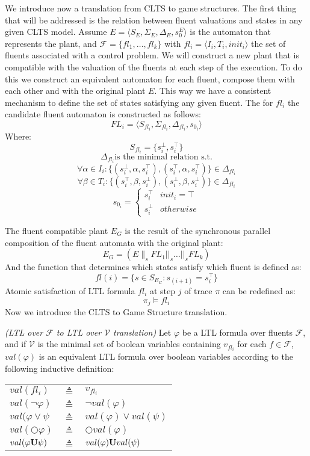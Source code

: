
We introduce now a translation from CLTS to game structures.
The first thing that will be addressed is the relation between fluent valuations and states in any given CLTS model. Assume $E = \langle S_E, \Sigma_E, \Delta_E, s^E_0 \rangle$ is the automaton that represents the plant, and $\mathcal{F}=\{fl_1,\ldots,fl_k\}$ with $fl_i = \langle I_i, T_i, init_i \rangle$ the set of fluents associated with a control problem. We will construct a new plant that is compatible with the valuation of the fluents at each step of the execution. To do this we construct an equivalent automaton for each fluent, compose them with each other and with the original plant $E$. This way we have a consistent mechanism to define the set of states satisfying any given fluent.  The for $fl_i$ the candidate fluent automaton is constructed as follows:
\[ FL_i = \langle S_{fl_i}, \Sigma_{fl_i}, \Delta_{fl_i}, s_{0_i}\rangle \]
Where:
\[S_{fl_i}= \{s^{\bot}_i, s^{\top}_i\} \]
\[\Delta_{fl_i} \text{is the minimal relation s.t.}\]
\[ \forall \alpha \in I_i: \{(s^{\bot}_i,\alpha,s^{\top}_i), (s^{\top}_i,\alpha,s^{\top}_i)\} \in \Delta_{fl_i} \]
\[ \forall \beta \in T_i: \{(s^{\top}_i,\beta,s^{\bot}_i), (s^{\bot}_i,\beta,s^{\bot}_i)\} \in \Delta_{fl_i} \]
\[
s_{0_i} = \begin{cases}
s^{\top}_i & init_i = \top \\
s^{\bot}_i & otherwise
\end{cases}
\]

The fluent compatible plant $E_G$ is the result of the synchronous parallel composition of the fluent automata with the original plant:
\[E_G = (E \parallel_s FL_1 ||_s \ldots ||_s FL_k) \]
And the function that determines which states satisfy which fluent is defined as:
\[ fl(i) = \{s \in S_{E_G} : s_{(i + 1)} = s^{\top}_i \} \]
Atomic satisfaction of LTL formula $fl_i$ at step $j$ of trace $\pi$ can be redefined as:
\[ \pi_j \models fl_i \]
Now we introduce the CLTS to Game Structure translation.
\begin{definition}
	\label{def:val_ltl} \emph{(LTL over $\mathcal{F}$ to LTL over $\mathcal{V}$ translation)} 
	Let $\varphi$ be a LTL formula over fluents $\mathcal{F}$, and if $\mathcal{V}$ is the minimal set of boolean variables containing $v_{fl_i}$ for each $f \in \mathcal{F}$, $val(\varphi)$ is an equivalent LTL formula over boolean variables according to the following inductive definition:\\
	
	\begin{tabular}{ l c l }
		$val(fl_i)$ & $\triangleq$ & $v_{fl_i}$\\	
		$val(\neg \varphi)$ & $\triangleq$ & $\neg val(\varphi)$\\
		$val(\varphi \vee \psi$ & $\triangleq$ & $val(\varphi) \vee val(\psi)$\\
		$val(\bigcirc \varphi)$ & $\triangleq$ & $\bigcirc val(\varphi)$\\
		$val(\varphi {\bf U} \psi)$ & $\triangleq$ & $val(\varphi) {\bf U} val(\psi)$\\
	\end{tabular}	
\end{definition}

